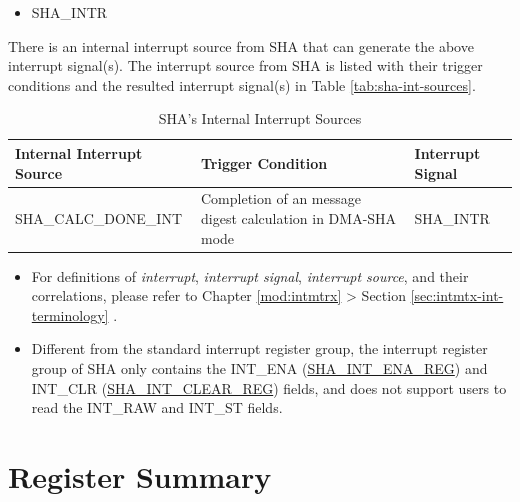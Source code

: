 \documentclass[main\_\_EN.tex]{subfiles}
\begin{document}
    \begin{itemize}
        \item SHA\_INTR
    \end{itemize}

There is an internal interrupt source from SHA that can generate the above interrupt signal(s). The interrupt source from SHA is listed with their trigger conditions and the resulted interrupt signal(s) in Table \ref{tab:sha-int-sources}.

\begin{longtable}{ | L{5cm} | L{6.5cm} | L{4cm} | }
\caption{SHA's Internal Interrupt Sources} \label{tab:sha-int-sources}
\\ \hline
{}
\textbf{Internal Interrupt Source} & \textbf{Trigger Condition}  &  \textbf{Interrupt Signal}\\ \hline
\label{int:SHACALCDONEINT}SHA\_CALC\_DONE\_INT  &  Completion of an message digest calculation in DMA-SHA mode &  SHA\_INTR  \\ \hline
\end{longtable}

\begin{tiplisting}
\begin{itemize}
    \vspace{-1em}
    \item For definitions of \textit{interrupt}, \textit{interrupt signal}, \textit{interrupt source}, and their correlations, please refer to Chapter \ref{mod:intmtrx} \textit{} > Section \ref{sec:intmtx-int-terminology} \textit{}.
    \item Different from the standard interrupt register group, the interrupt register group of SHA only contains the INT\_ENA (\hyperref[regdesc:SHAINTENAREG]{SHA\_INT\_ENA\_REG}) and INT\_CLR (\hyperref[regdesc:SHAINTCLEARREG]{SHA\_INT\_CLEAR\_REG}) fields, and does not support users to read the INT\_RAW and INT\_ST fields.
\end{itemize}
\end{tiplisting}




\newpage
\hypertarget{sha-reg-summ}{}
\section{Register Summary} \label{sec:sha-reg-summ}
\end{document}
